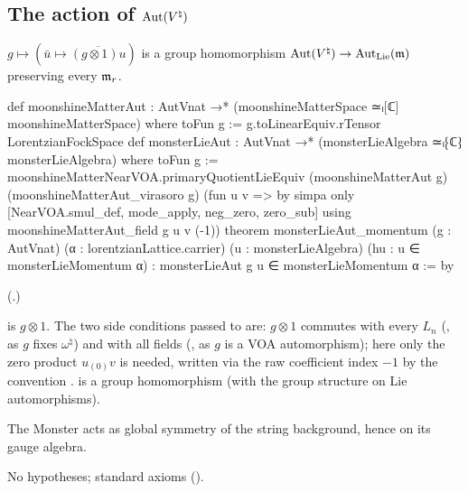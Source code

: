 \subsection{\texorpdfstring{The action of $\operatorname{Aut}({V^{\natural}})$}{The action of Aut(V-natural)}}

\begin{theorem}\label{ch18:thm:autaction}
$g\mapsto(\bar u\mapsto\overline{(g\otimes1)u})$ is a group homomorphism $\operatorname{Aut}({V^{\natural}})\to\operatorname{Aut}_{\mathrm{Lie}}(\mathfrak{m})$ preserving
every $\mathfrak{m}_r$.
\end{theorem}
\begin{leancode}
def moonshineMatterAut : AutVnat →* (moonshineMatterSpace ≃ₗ[ℂ] moonshineMatterSpace) where
  toFun g := g.toLinearEquiv.rTensor LorentzianFockSpace
def monsterLieAut : AutVnat →* (monsterLieAlgebra ≃ₗ⁅ℂ⁆ monsterLieAlgebra) where
  toFun g := moonshineMatterNearVOA.primaryQuotientLieEquiv (moonshineMatterAut g)
    (moonshineMatterAut_virasoro g) (fun u v => by
      simpa only [NearVOA.smul_def, mode_apply, neg_zero, zero_sub]
        using moonshineMatterAut_field g u v (-1))
theorem monsterLieAut_momentum (g : AutVnat) (α : lorentzianLattice.carrier)
    (u : monsterLieAlgebra) (hu : u ∈ monsterLieMomentum α) :
    monsterLieAut g u ∈ monsterLieMomentum α := by
\end{leancode}
(.)
\begin{dictionary}
 is $g\otimes1$.  The two side conditions passed to
 are: $g\otimes1$ commutes with every $L_n$ (, as $g$
fixes $\omega^\natural$) and with all fields (, as $g$ is a VOA automorphism); here only the
zero product $u_{(0)}v$ is needed, written via the raw coefficient index $-1$ by the convention
.   is a group homomorphism (with the group structure
 on Lie automorphisms).
\end{dictionary}
\begin{physics}The Monster acts as global symmetry of the string background, hence on its gauge algebra.\end{physics}
\begin{status}No hypotheses; standard axioms ().\end{status}

